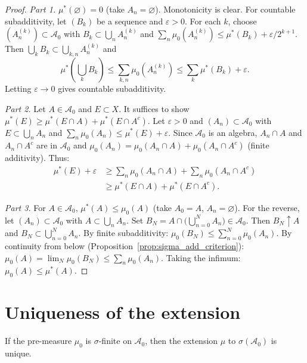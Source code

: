 \begin{proof}
\emph{Part 1.} $\mu^*(\varnothing) = 0$ (take $A_n = \varnothing$). Monotonicity
is clear. For countable subadditivity, let $(B_k)$ be a sequence and
$\varepsilon > 0$. For each $k$, choose $(A_n^{(k)}) \subset \mathcal{A}_0$ with
$B_k \subset \bigcup_n A_n^{(k)}$ and $\sum_n \mu_0(A_n^{(k)}) \leq
\mu^*(B_k) + \varepsilon/2^{k+1}$. Then $\bigcup_k B_k \subset
\bigcup_{k,n} A_n^{(k)}$ and
\[
\mu^*\!\left(\bigcup_k B_k\right) \leq \sum_{k,n} \mu_0(A_n^{(k)}) \leq
\sum_k \mu^*(B_k) + \varepsilon.
\]
Letting $\varepsilon \to 0$ gives countable subadditivity.

\emph{Part 2.} Let $A \in \mathcal{A}_0$ and $E \subset X$. It suffices to show
$\mu^*(E) \geq \mu^*(E \cap A) + \mu^*(E \cap A^c)$. Let $\varepsilon > 0$ and
$(A_n) \subset \mathcal{A}_0$ with $E \subset \bigcup_n A_n$ and
$\sum_n \mu_0(A_n) \leq \mu^*(E) + \varepsilon$. Since $\mathcal{A}_0$ is an
algebra, $A_n \cap A$ and $A_n \cap A^c$ are in $\mathcal{A}_0$ and
$\mu_0(A_n) = \mu_0(A_n \cap A) + \mu_0(A_n \cap A^c)$ (finite additivity). Thus:
\begin{align*}
\mu^*(E) + \varepsilon &\geq \sum_n \mu_0(A_n \cap A) + \sum_n \mu_0(A_n \cap A^c)
\\ &\geq \mu^*(E \cap A) + \mu^*(E \cap A^c).
\end{align*}

\emph{Part 3.} For $A \in \mathcal{A}_0$, $\mu^*(A) \leq \mu_0(A)$ (take
$A_0 = A$, $A_n = \varnothing$). For the reverse, let $(A_n) \subset \mathcal{A}_0$
with $A \subset \bigcup_n A_n$. Set $B_N = A \cap \bigl(\bigcup_{n=0}^N A_n\bigr)
\in \mathcal{A}_0$. Then $B_N \uparrow A$ and $B_N \subset \bigcup_{n=0}^N A_n$.
By finite subadditivity: $\mu_0(B_N) \leq \sum_{n=0}^N \mu_0(A_n)$. By
continuity from below (Proposition~\ref{prop:sigma_add_criterion}):
$\mu_0(A) = \lim_N \mu_0(B_N) \leq \sum_n \mu_0(A_n)$. Taking the infimum:
$\mu_0(A) \leq \mu^*(A)$.
\end{proof}

\section{Uniqueness of the extension}

\begin{theorem}[Uniqueness]
\label{thm:uniqueness_extension}
If the pre-measure $\mu_0$ is $\sigma$-finite on $\mathcal{A}_0$, then the extension
$\mu$ to $\sigma(\mathcal{A}_0)$ is unique.
\end{theorem}

